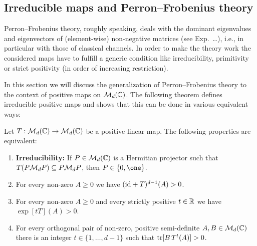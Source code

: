 \documentclass[11pt,a4paper]{article}
\theoremstyle{plain}
\theoremstyle{definition}
\theoremstyle{remark}
\begin{document}
\subsection{Irreducible maps and Perron--Frobenius theory}

Perron--Frobenius theory, roughly speaking, deals with the dominant eigenvalues
and eigenvectors of (element-wise) non-negative matrices (see Exp.\ \dots), i.e.,
in particular with those of classical channels. In order to make the theory work
the considered maps have to fulfill a generic condition like irreducibility,
primitivity or strict positivity (in order of increasing restriction).

In this section we will discuss the generalization of Perron--Frobenius theory to
the context of positive maps on $\mathcal{M}_d(\mathbb{C})$. The following theorem defines
irreducible positive maps and shows that this can be done in various equivalent
ways:

\begin{theorem}
    Let $T:\mathcal{M}_d(\mathbb{C})\to\mathcal{M}_d(\mathbb{C})$ be a positive linear map. The following properties
    are equivalent:
    \begin{enumerate}
        \item \textbf{Irreducibility:} If $P\in\mathcal{M}_d(\mathbb{C})$ is a Hermitian projector such
              that $T(P\mathcal{M}_dP)\subseteq P\mathcal{M}_dP$, then $P\in\{0,\one\}$.
        \item For every non-zero $A\ge 0$ we have $(\mathrm{id} + T)^{d-1}(A)>0$.
        \item For every non-zero $A\ge 0$ and every strictly positive $t\in\mathbb{R}$ we have
              $\exp[tT](A)>0$.
        \item For every orthogonal pair of non-zero, positive semi-definite $A,B\in\mathcal{M}_d(\mathbb{C})$
              there is an integer $t\in\{1,\dots,d-1\}$ such that $\operatorname{tr}[B\,T^t(A)]>0$.
    \end{enumerate}
\end{theorem}
\end{document}
